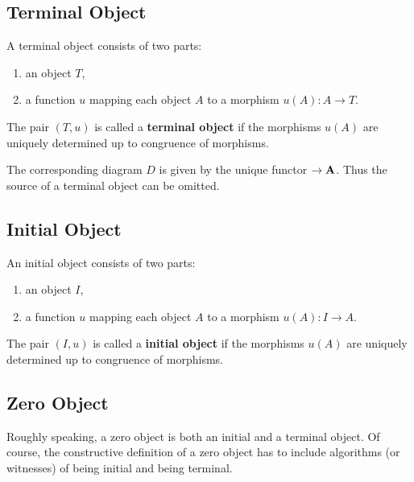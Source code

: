 \subsection{Terminal Object}

\begin{definition}
 A terminal object consists of two parts:
 \begin{enumerate}
  \item an object $T$,
  \item a function $u$ mapping each object $A$ to a morphism $u( A ): A \rightarrow T$.
 \end{enumerate}
 The pair $( T, u )$ is called a \textbf{terminal object} if the morphisms $u( A )$ are uniquely determined up to
 congruence of morphisms.
\end{definition}

\begin{remark}
 The corresponding diagram $D$ is given by the unique functor $\empty \rightarrow \mathbf{A}$.
 Thus the source of a terminal object can be omitted.
\end{remark}

\subsection{Initial Object}

\begin{definition}
 An initial object consists of two parts:
 \begin{enumerate}
  \item an object $I$,
  \item a function $u$ mapping each object $A$ to a morphism $u( A ): I \rightarrow A$.
 \end{enumerate}
  The pair $(I,u)$ is called a \textbf{initial object} if the morphisms $u(A)$ are uniquely determined up to
 congruence of morphisms.
\end{definition}

\subsection{Zero Object}

Roughly speaking, a zero object is both an initial and a terminal object.
Of course, the constructive definition of a zero object has to include
algorithms (or witnesses) of being initial and being terminal.


